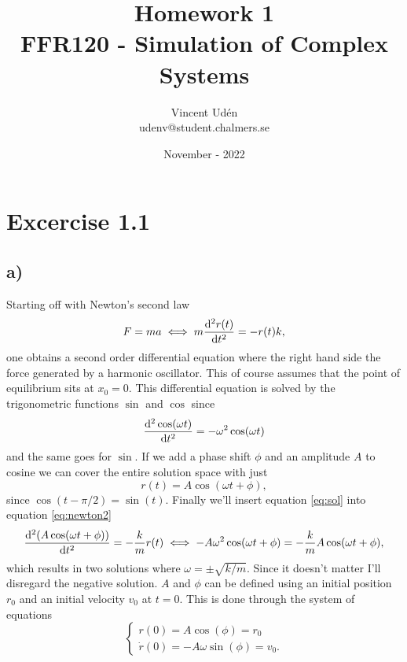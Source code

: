 \documentclass[a4paper, 12pt]{article}
\begin{document}
\title{\vspace{-4cm}Homework 1\\\large{FFR120 - Simulation of Complex Systems}\vspace{-0.7cm}}
\author{Vincent Udén\\udenv@student.chalmers.se}
\date{November - 2022}

\maketitle

\section*{Excercise 1.1}

\subsection*{a)}
Starting off with Newton's second law
\begin{equation} \label{eq:newton2}
    F = ma \iff m \dv[2]{r(t)}{t} = -r(t)k,
\end{equation}
one obtains a second order differential equation where the right hand side the force generated by a harmonic oscillator. This of course assumes that the point of equilibrium sits at $x_0 = 0$. This differential equation is solved by the trigonometric functions $\sin$ and $\cos$ since
\begin{equation}
    \dv[2]{\cos(\omega t)}{t} = -\omega^2 \cos(\omega t)
\end{equation}
and the same goes for $\sin$. If we add a phase shift $\phi$ and an amplitude $A$ to cosine we can cover the entire solution space with just
\begin{equation} \label{eq:sol}
    r(t) = A \cos(\omega t + \phi),
\end{equation}
since $\cos(t - \pi/2) = \sin(t)$. Finally we'll insert equation \eqref{eq:sol} into equation \eqref{eq:newton2}
\begin{equation}
    \dv[2]{(A \cos(\omega t + \phi))}{t} = - \frac{k}{m} r(t) \iff -A \omega^2 \cos(\omega t + \phi) = - \frac{k}{m} A \cos(\omega t + \phi),
\end{equation}
which results in two solutions where $\omega = \pm \sqrt{k/m}$. Since it doesn't matter I'll disregard the negative solution. $A$ and $\phi$ can be defined using an initial position $r_0$ and an initial velocity $v_0$ at $t=0$. This is done through the system of equations
\begin{equation}
    \begin{cases}
        r(0) = A \cos(\phi) = r_0 \\
        \dot{r}(0) = - A \omega \sin(\phi) = v_0.
    \end{cases}
\end{equation}
\end{document}
